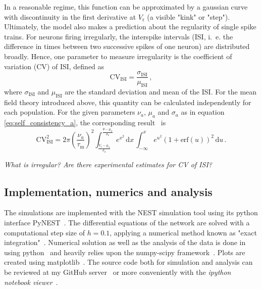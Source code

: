 In a reasonable regime, this function can be approximated by a gaussian curve with discontinuity in the first 
derivative at $V_\text{r}$ (a visible "kink" or "step").
Ultimately, the model also makes a prediction about the regularity of single spike 
trains. For neurons firing irregularly, the interspike intervals
(ISI, i.~e. the difference in times between two successive spikes of one neuron) 
are distributed broadly. Hence, one parameter to measure irregularity is the coefficient 
of variation (CV) of ISI, defined as
\begin{equation}
    \text{CV}_\text{ISI} = \frac{\sigma_\text{ISI}}{\mu_\text{ISI}} \,,
    \label{eq:cv_isi}
\end{equation}
where $\sigma_\text{ISI}$ and $\mu_\text{ISI}$ are the standard deviation and mean of 
the ISI. For the mean field theory introduced above, this quantity can be calculated
independently for each population. For the given parameters $\nu_a$, $\mu_a$ and 
$\sigma_a$ as in equation \eqref{eq:self_consistency_a}, the corresponding 
result~\cite{brunel2000} is
\begin{equation}
    \text{CV}_\text{ISI}^2 
        = 2 \pi \left(\frac{\nu_a}{\tau_\text{m}}\right)^2
            \int_{\frac{V_\text{r} - \mu_{a}}{\sigma_{a}}}^{\frac{\theta - \mu_{a}}{\sigma_{a}}} 
            e^{x^2}  \,\text{d}x  \,
            \int_{-\infty}^{x} 
            e^{u^2} \left(1 + \text{erf}(u)\right)^2 \,\text{d}u  \,.
    \label{eq:CV_ISI_mf}
\end{equation}

\emph{What is irregular? Are there experimental estimates for CV of ISI?}

\subsection{Implementation, numerics and analysis}
\label{subsec:analysis}
The simulations are implemented with the NEST simulation tool using its python interface
PyNEST~\cite{NEST}. The differential equations of the network are solved with a computational 
step size of $h=0.1$, applying a numerical method known as "exact integration"~\cite{rotter1999exact}.
Numerical solution as well as the analysis of the data is done in using 
python~\cite{python} and heavily relies upon the numpy-scipy framework~\cite{scipy}. 
Plots are created using matplotlib~\cite{matplotlib}.
The source code both for simulation and analysis can be reviewed at my
GitHub server~\cite{ba_github} or more conveniently with the 
\textit{ipython notebook viewer}~\cite{notebook_viewer}.

